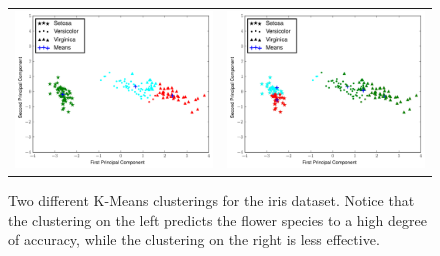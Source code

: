 \begin{figure}[h]
	\centering
	\begin{tabular}{cc}
	\includegraphics[width=.49\textwidth]{iris_means_1.pdf} &
	\includegraphics[width=.49\textwidth]{iris_means_2.pdf} 
	\end{tabular}
	\caption{Two different K-Means clusterings for the iris dataset. 
            Notice that the clustering on the left predicts the flower species to a high degree of accuracy,
            while the clustering on the right is less effective.}
    \label{fig:iris_clusterings}
\end{figure}

